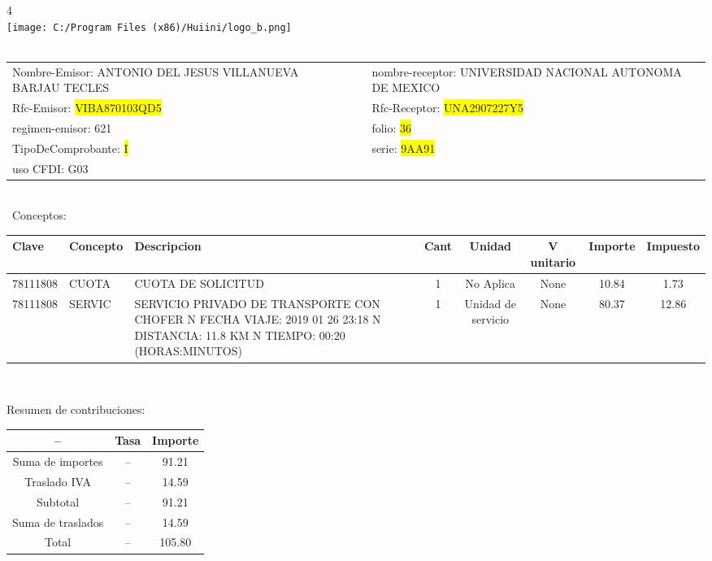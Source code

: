 \documentclass{article}
\begin{document}
\hspace{18cm} 4\\
\texttt{[image: C:/Program Files (x86)/Huiini/logo\_b.png]}
\bigskip\\\
\begin{tabular}{p{11cm}p{1cm}p{8cm}}

Nombre-Emisor: ANTONIO DEL JESUS VILLANUEVA BARJAU TECLES && nombre-receptor: UNIVERSIDAD NACIONAL AUTONOMA DE MEXICO\\

Rfc-Emisor: \colorbox{yellow}{ VIBA870103QD5 } & & Rfc-Receptor: \colorbox{yellow}{ UNA2907227Y5 }\\

regimen-emisor: 621 & & folio: \colorbox{yellow}{ 36 }\\

TipoDeComprobante: \colorbox{yellow}{ I } & & serie: \colorbox{yellow}{ 9AA91 }\\

uso CFDI: G03\\



\end{tabular}
\bigskip\bigskip\bigskip\\\
Conceptos:\\
\begin{tabular}{|p{1.5cm}|p{3.6cm}|p{3.6cm}|c|c|c|c|c|}
\hline
Clave & Concepto & Descripcion & Cant & Unidad & V unitario & Importe & Impuesto \\
\hline

78111808 & CUOTA  & CUOTA DE SOLICITUD & 1 & No Aplica & None & 10.84 &  1.73 \\
\hline

78111808 & SERVIC & SERVICIO PRIVADO DE TRANSPORTE CON CHOFER  N FECHA VIAJE: 2019 01 26 23:18  N DISTANCIA: 11.8 KM  N TIEMPO: 00:20 (HORAS:MINUTOS) & 1 & Unidad de servicio & None & 80.37 &  12.86 \\
\hline

\end{tabular}\\
\bigskip
\begin{center}
Resumen de contribuciones:\\
\bigskip
\begin{tabular}{|c|c|c|}
\hline
 -- & Tasa & Importe\\
\hline

Suma de importes & -- & 91.21 \\
\hline

Traslado IVA & -- & 14.59 \\
\hline

Subtotal  & -- & 91.21 \\
\hline

Suma de traslados & -- & 14.59 \\
\hline

Total  & -- & 105.80 \\
\hline

\end{tabular}
\end{center}
\end{document}
